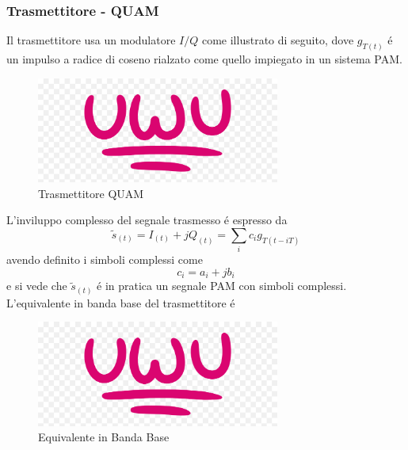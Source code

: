         \subsubsection{Trasmettitore - QUAM}
            Il trasmettitore usa un modulatore $I/Q$ come illustrato di seguito, dove $g_{T(t)}$ é un impulso a radice di coseno rialzato 
            come quello impiegato in un sistema PAM.
            \begin{figure}[H]
                \centering
                \includegraphics*[width = 8cm]{media/uwu.png}
                \caption{Trasmettitore QUAM}
            \end{figure}
            L'inviluppo complesso del segnale trasmesso é espresso da
            \[
                \tilde{s}_{(t)} = I_{(t)} +jQ_{(t)} = \sum_{i}c_ig_{T(t-iT)}
            \]
            avendo definito i simboli complessi come 
            \[
                c_i = a_i+jb_i    
            \]
            e si vede che $\tilde{s}_{(t)}$ é in pratica un segnale PAM con simboli complessi. L'equivalente in banda base del trasmettitore é 
            \begin{figure}[H]
                \centering
                \includegraphics*[width = 8cm]{media/uwu.png}
                \caption{Equivalente in Banda Base}
            \end{figure}
